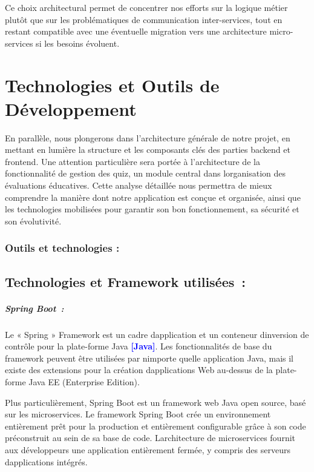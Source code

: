 \documentclass[12pt,a4paper,twoside,openright]{report}
\newcommand{\toabbrev}[1]{\textcolor{blue}{\textbf{[#1]}}}
\begin{document}
Ce choix architectural permet de concentrer nos efforts sur la logique métier plutôt que sur les problématiques de communication inter-services, tout en restant compatible avec une éventuelle migration vers une architecture micro-services si les besoins évoluent.

\section{Technologies et Outils de Développement}

En parallèle, nous plongerons dans l'architecture générale de notre projet, en mettant en lumière la structure et les composants clés des parties backend et frontend. Une attention particulière sera portée à l'architecture de la fonctionnalité de gestion des quiz, un module central dans
l\textquotesingle organisation des évaluations éducatives. Cette analyse
détaillée nous permettra de mieux comprendre la manière dont notre
application est conçue et organisée, ainsi que les technologies
mobilisées pour garantir son bon fonctionnement, sa sécurité et son
évolutivité.

\hypertarget{outils-et-technologies}{%
\subsubsection{Outils et technologies :}\label{outils-et-technologies}}

\hypertarget{technologies-et-framework-utilisuxe9es}{%
\subsection{Technologies et Framework
utilisées~:}\label{technologies-et-framework-utilisuxe9es}}

\hypertarget{spring-boot}{%
\subparagraph{Spring Boot~:}\label{spring-boot}}

Le « Spring » Framework est un cadre d\textquotesingle application et un
conteneur d\textquotesingle inversion de contrôle pour la plate-forme
Java \toabbrev{Java}. Les fonctionnalités de base du framework peuvent être utilisées
par n\textquotesingle importe quelle application Java, mais il existe
des extensions pour la création d\textquotesingle applications Web
au-dessus de la plate-forme Java EE (Enterprise Edition).

Plus particulièrement, Spring Boot est un framework web Java open
source, basé sur les microservices. Le framework Spring Boot crée un
environnement entièrement prêt pour la production et entièrement
configurable grâce à son code préconstruit au sein de sa base de code.
L\textquotesingle architecture de microservices fournit aux développeurs
une application entièrement fermée, y compris des serveurs
d\textquotesingle applications intégrés.
\end{document}
